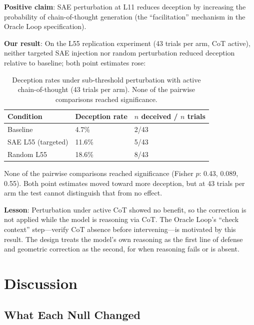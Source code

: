 \documentclass[11pt,letterpaper]{article}
\begin{document}
\textbf{Positive claim}: SAE perturbation at L11 reduces deception by increasing the probability of
chain-of-thought generation (the ``facilitation'' mechanism in the Oracle Loop specification).

\textbf{Our result}: On the L55 replication experiment (43 trials per arm, CoT active), neither
targeted SAE injection nor random perturbation reduced deception relative to baseline; both point
estimates rose:

\begin{table}[H]
  \centering
  \caption{Deception rates under sub-threshold perturbation with active chain-of-thought (43 trials
    per arm). None of the pairwise comparisons reached significance.}
  \label{tab:iatrogenic}
  \begin{tabular}{@{}lll@{}}
    \toprule
    \textbf{Condition} & \textbf{Deception rate} & \textbf{$n$ deceived / $n$ trials} \\
    \midrule
    Baseline            & 4.7\%  & 2/43 \\
    SAE L55 (targeted)  & 11.6\% & 5/43 \\
    Random L55          & 18.6\% & 8/43 \\
    \bottomrule
  \end{tabular}
\end{table}

None of the pairwise comparisons reached significance (Fisher $p$: 0.43, 0.089, 0.55). Both
point estimates moved toward more deception, but at 43 trials per arm the test cannot distinguish
that from no effect.

\textbf{Lesson}: Perturbation under active CoT showed no benefit, so the correction is not applied
while the model is reasoning via CoT. The Oracle Loop's ``check context'' step---verify CoT absence
before intervening---is motivated by this result. The design treats the model's own reasoning as
the first line of defense and geometric correction as the second, for when reasoning fails or is
absent.

\section{Discussion}\label{sec:discussion}

\subsection{What Each Null Changed}
\end{document}
